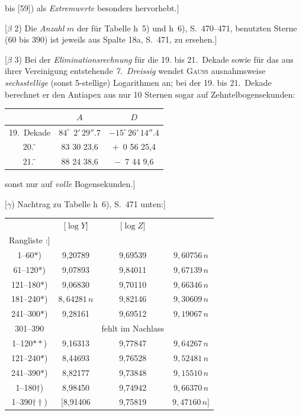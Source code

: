 \documentclass[12pt,a4paper]{article}
\theoremstyle{plain}
\theoremstyle{definition}
\theoremstyle{remark}
\begin{document}
\begin{footnotesize}
[$\beta$ 1) In den Spalten 16--17 der Tabellen h~2) und h~4) sind diejenigen
Rektaszensions- und Deklinationswerte \textit{durch ein Sternchen} gekennzeichnet,
welche \textsc{Gau\ss} selbst in seinem Briefe an \textsc{Olbers} (S.~442--443 bei [56]
bis [59]) als \textit{Extremwerte} besonders hervorhebt.]

[$\beta$ 2) Die \textit{Anzahl} $m$ der f\"ur Tabelle h~5) und h~6), S.~470--471,
benutzten Sterne (60 bis 390) ist jeweils aus Spalte 18a, S.~471, zu ersehen.]

[$\beta$ 3) Bei der \textit{Eliminationsrechnung} f\"ur die 19. bis 21.~Dekade sowie
f\"ur das aus ihrer Vereinigung entstehende \textit{7.~Dreissig} wendet \textsc{Gau\ss}
ausnahmsweise \textit{sechsstellige} (sonst 5-stellige) Logarithmen an; bei der 19.
bis 21.~Dekade berechnet er den Antiapex aus nur 10 Sternen sogar auf
Zehntelbogensekunden:
\begin{center}
\begin{tabular}{c|c|c}
& $A$ & $D$ \\
\hline
19.~Dekade & $84^{\circ}\;\,2'\,29''\!\!.7$ & $-15^{\circ}\,26'\,14''\!\!.4$ \\
20.\phantom{0}\phantom{0} \" & 83 30 23,6 & $+\phantom{0}0$ 56 25,4 \\
21.\phantom{0}\phantom{0} \" & 88 24 38,6 & $-\phantom{0}7$ 44 \phantom{0}9,6 \\
\end{tabular}
\end{center}
sonst nur auf \textit{volle} Bogensekunden.]

[$\gamma$) Nachtrag zu Tabelle h~6), S.~471 unten:]

\begin{center}
\begin{tabular}{|c|c|c|c|}
\hline
[Nos.~der & [$\log X$] & [$\log Y$] & [$\log Z$] \\
Rangliste :] & & & \\
\hline
1--\phantom{0}60$*$) & 9,20789 & 9,69539 & $9,60756\,n$ \\
61--120$*$) & 9,07893 & 9,84011 & $9,67139\,n$ \\
121--180$*$) & 9,06830 & 9,70110 & $9,66346\,n$ \\
181--240$*$) & $8,64281\,n$ & 9,82146 & $9,30609\,n$ \\
241--300$*$) & 9,28161 & 9,69512 & $9,19067\,n$ \\
301--390 & & fehlt im Nachlass & \\
\hline
1--120$**$) & 9,16313 & 9,77847 & $9,64267\,n$ \\
121--240$*$) & 8,44693 & 9,76528 & $9,52481\,n$ \\
241--390$*$) & 8,82177 & 9,73848 & $9,15510\,n$ \\
\hline
1--180$\dagger$) & 8,98450 & 9,74942 & $9,66370\,n$ \\
1--390$\dagger\dagger$) & [8,91406 & 9,75819 & $9,47160\,n$] \\
\hline
\end{tabular}
\end{center}


\end{footnotesize}
\end{document}
